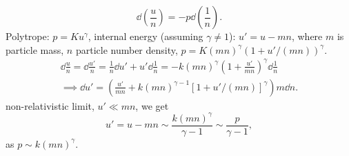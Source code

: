 \documentclass{book}
\begin{document}
    \begin{equation}
        \dd \left(\frac{u}{n}\right) = - p \dd \left(\frac{1}{n}\right).
    \end{equation}
    Polytrope: $p = K u^\gamma$, internal energy (assuming $\gamma \neq 1$): $u' = u - m n$, where $m$ is particle mass, $n$ particle number density, $p = K (mn)^\gamma (1 + u' / (mn))^\gamma$.
    \begin{align}
        \dd \frac{u}{n}= \dd \frac{u'}{n} =  \frac{1}{n} \dd u' + u'\dd \frac{1}{n}  = - k (m n)^\gamma \left(1 + \frac{u'}{mn}\right)^\gamma \dd \frac{1}{n}\\ 
        \implies \dd u' = \left(\frac{u'}{mn} + k(mn)^{\gamma - 1}[1 + u' /(mn)]^\gamma \right) m \dd n.
    \end{align}
    non-relativistic limit, $u' \ll mn$, we get
    \begin{equation}
        u' = u - mn \sim \frac{k (mn)^\gamma}{\gamma - 1} \sim \frac{p}{\gamma - 1}, 
    \end{equation}
    as $p \sim k (mn)^\gamma$.
\end{document}
